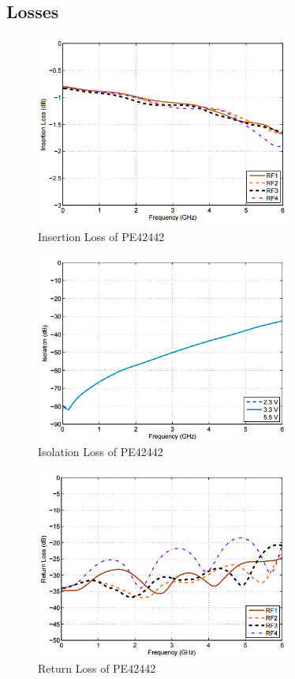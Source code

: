 \documentclass[12pt,openany,a4paper]{book}
\begin{document}
\subsection{Losses}
\begin{figure}[H]
	\centering
    \includegraphics[width=0.75\textwidth]{pe424244-datasheet-insertion.png}
	\caption{Insertion Loss of PE42442}
	\label{fig:pe42442-insertion}
\end{figure} 
\begin{figure}[H]
	\centering
    \includegraphics[width=0.75\textwidth]{pe424244-datasheet-isolation.png}
	\caption{Isolation Loss of PE42442}
	\label{fig:pe42442-isolation}
\end{figure} 
\begin{figure}[H]
	\centering
    \includegraphics[width=0.75\textwidth]{pe424244-datasheet-return.png}
	\caption{Return Loss of PE42442}
	\label{fig:pe42442-return}
\end{figure} 
\end{document}
